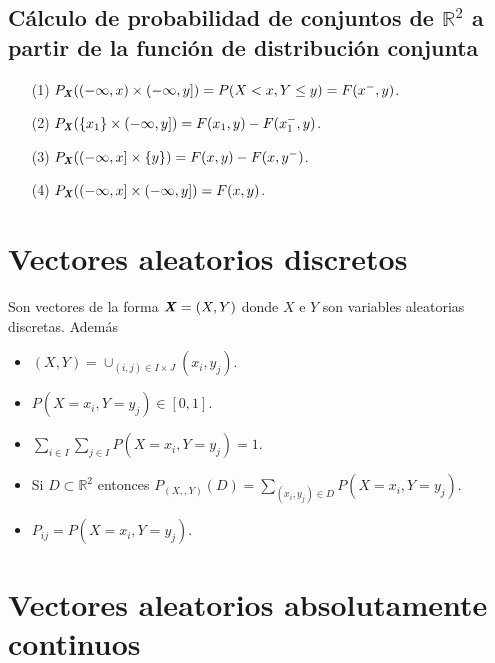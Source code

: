 \subsection{Cálculo de probabilidad de conjuntos de $\mathbb{R}^2$ a partir de la función de distribución conjunta}

\begin{enumerate}
    \item[(1)] $P_{\textbf{\textit{X}}}((-\infty,x) \times (-\infty,y]) = P(X < x, Y \leq y) = F(x^-,y)$.
    \item[(2)] $P_{\textbf{\textit{X}}}(\{x_1\} \times (-\infty,y]) = F(x_1,y) - F(x_1^-,y)$.
    \item[(3)] $P_{\textbf{\textit{X}}}((-\infty,x] \times \{y\}) = F(x,y) - F(x,y^-)$.
    \item[(4)] $P_{\textbf{\textit{X}}}((-\infty,x] \times (-\infty,y]) = F(x,y)$.
\end{enumerate}
\section{Vectores aleatorios discretos}

Son vectores de la forma $\textbf{\textit{X}} = (X,Y)$ donde $X$ e $Y$ son variables aleatorias discretas. Además
\begin{itemize}
    \item $(X,Y) = \cup_{(i,j) \in I \times J}{(x_i,y_j)}$.
    \item $P(X = x_i, Y = y_j) \in [0,1]$.
    \item $\sum_{i \in I}{\sum_{j \in I}{P(X = x_i, Y = y_j)}} = 1$.
    \item Si $D \subset \mathbb{R}^2$ entonces $P_{(X,,Y)}(D) = \sum_{(x_i,y_j) \in D}{P(X = x_i, Y = y_j)}$.
    \item $P_{ij} = P(X = x_i, Y = y_j)$.
\end{itemize}

\section{Vectores aleatorios absolutamente continuos}

